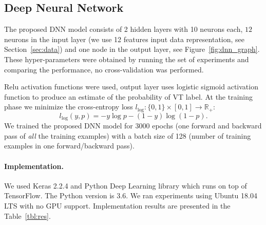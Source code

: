 \subsection{Deep Neural Network}
\label{sec:dnn}

The proposed DNN model consists of 2 hidden layers with 10 neurons 
each, $12$ 
neurons in the input layer (we use 12 features input data 
representation, see Section~\ref{sec:data}) and one node in the 
output layer, see 
Figure~\ref{fig:dnn_graph}. These hyper-parameters were obtained by 
running the set of experiments and comparing the performance, no 
cross-validation was performed.  

Relu activation functions were used, output layer uses logistic 
sigmoid activation function to produce an estimate of the probability 
of VT label.
At the training phase we minimize the cross-entropy loss 
$l_{\log}:\{0,1\}\times[0,1]\rightarrow\mathbb{R}_{+}$:
\begin{equation}
l_{\log}(y,p)= -y\log p - (1-y)\log(1-p).
\end{equation}
We trained the proposed DNN model for 3000 epochs (one forward and 
backward pass of \textit{all} the training examples) with a batch 
size of 128 (number of training examples in one forward/backward 
pass). 

\paragraph{Implementation.}
We used Keras 2.2.4 and Python Deep Learning library which runs on 
top of TensorFlow. The Python version is 3.6.
We ran experiments using Ubuntu 18.04 LTS with no GPU support.
Implementation results are presented in the Table~\ref{tbl:res}.